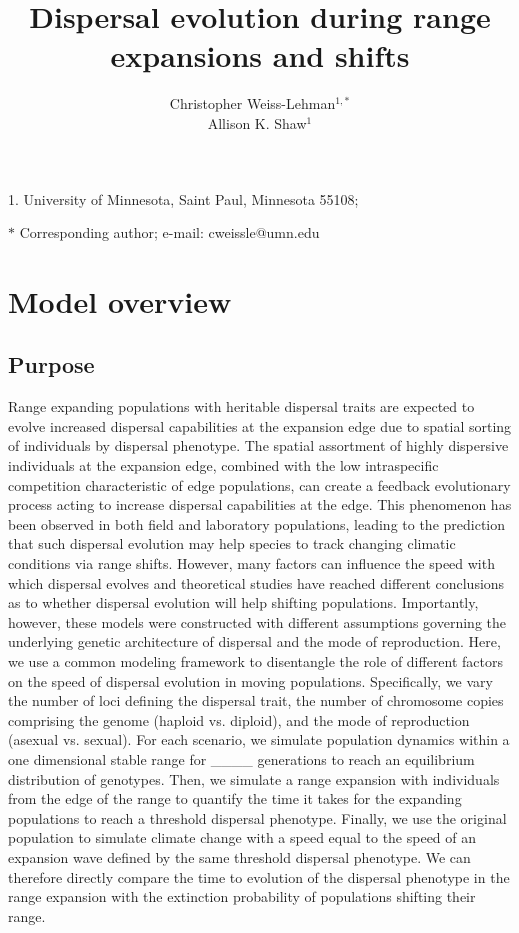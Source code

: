 \documentclass[11pt]{article}
\title{Dispersal evolution during range expansions and shifts}
\author{Christopher Weiss-Lehman$^{1,\ast}$ \\ 
Allison K. Shaw$^{1}$}
\date{}
\begin{document}
\maketitle

\noindent{} 1. University of Minnesota, Saint Paul, Minnesota 55108;

\noindent{} $\ast$ Corresponding author; e-mail: cweissle@umn.edu

\bigskip


\linenumbers{}
\modulolinenumbers[3]

\newpage{}

\section*{Model overview}
\subsection*{Purpose} 
Range expanding populations with heritable dispersal traits are expected to evolve increased dispersal capabilities at the expansion edge due to spatial sorting of individuals by dispersal phenotype. The spatial assortment of highly dispersive individuals at the expansion edge, combined with the low intraspecific competition characteristic of edge populations, can create a feedback evolutionary process acting to increase dispersal capabilities at the edge. This phenomenon has been observed in both field and laboratory populations, leading to the prediction that such dispersal evolution may help species to track changing climatic conditions via range shifts. However, many factors can influence the speed with which dispersal evolves and theoretical studies have reached different conclusions as to whether dispersal evolution will help shifting populations. Importantly, however, these models were constructed with different assumptions governing the underlying genetic architecture of dispersal and the mode of reproduction. Here, we use a common modeling framework to disentangle the role of different factors on the speed of dispersal evolution in moving populations. Specifically, we vary the number of loci defining the dispersal trait, the number of chromosome copies comprising the genome (haploid vs. diploid), and the mode of reproduction (asexual vs. sexual). For each scenario, we simulate population dynamics within a one dimensional stable range for \_\_\_\_ generations to reach an equilibrium distribution of genotypes. Then, we simulate a range expansion with individuals from the edge of the range to quantify the time it takes for the expanding populations to reach a threshold dispersal phenotype. Finally, we use the original population to simulate climate change with a speed equal to the speed of an expansion wave defined by the same threshold dispersal phenotype. We can therefore directly compare the time to evolution of the dispersal phenotype in the range expansion with the extinction probability of populations shifting their range.
\end{document}

